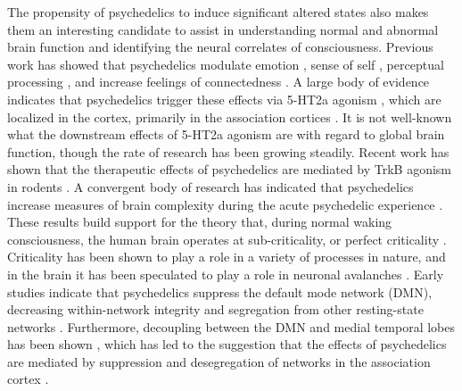 The propensity of psychedelics to induce significant altered states also
makes them an interesting candidate to assist in understanding normal
and abnormal brain function and identifying the neural correlates of
consciousness. Previous work has showed that psychedelics modulate
emotion \parencite{Roseman2019}, sense of self \parencite{Lebedev2015}, perceptual processing \parencite{Kometer2016}, and
increase feelings of connectedness \parencite{Carhart-Harris2018b}. A large body
of evidence indicates that psychedelics trigger these effects via 5-HT2a
agonism \parencite{Nichols2016}, which are localized in the cortex, primarily in
the association cortices \parencite{Nichols2016,Weber2010}. It is not
well-known what the downstream effects of 5-HT2a agonism are with regard
to global brain function, though the rate of research has been growing
steadily. Recent work has shown that the therapeutic effects of
psychedelics are mediated by TrkB agonism in rodents \parencite{Moliner2023}. A convergent body of research has indicated that psychedelics
increase measures of brain complexity during the acute psychedelic
experience \parencite{Lebedev2016,Tagliazucchi2014,Viol2017}. These results build support for the theory that, during
normal waking consciousness, the human brain operates at
sub-criticality, or perfect criticality \parencite{Carhart-Harris2014}.
Criticality has been shown to play a role in a variety of processes in
nature, and in the brain it has been speculated to play a role in
neuronal avalanches \parencite{Beggs2003}. Early studies indicate that
psychedelics suppress the default mode network (DMN), decreasing
within-network integrity and segregation from other resting-state
networks \parencite{Buckner2008,Carhart-Harris2012,Johnson2019,Muller2018,Petri2014,Roseman2014,Tagliazucchi2014,Timmermann2023}. Furthermore,
decoupling between the DMN and medial temporal lobes has been shown
\parencite{Carhart-Harris2014}, which has led to the suggestion that the
effects of psychedelics are mediated by suppression and desegregation of
networks in the association cortex \parencite{Girn2022}.


